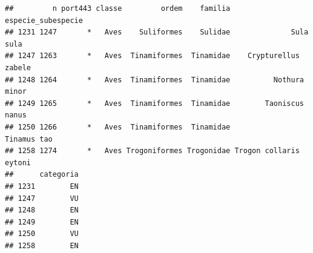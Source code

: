\documentclass[
]{article}
\begin{document}
\begin{verbatim}
##         n port443 classe         ordem    familia     especie_subespecie
## 1231 1247       *   Aves    Suliformes    Sulidae              Sula sula
## 1247 1263       *   Aves  Tinamiformes  Tinamidae    Crypturellus zabele
## 1248 1264       *   Aves  Tinamiformes  Tinamidae          Nothura minor
## 1249 1265       *   Aves  Tinamiformes  Tinamidae        Taoniscus nanus
## 1250 1266       *   Aves  Tinamiformes  Tinamidae            Tinamus tao
## 1258 1274       *   Aves Trogoniformes Trogonidae Trogon collaris eytoni
##      categoria
## 1231        EN
## 1247        VU
## 1248        EN
## 1249        EN
## 1250        VU
## 1258        EN
\end{verbatim}
\end{document}
